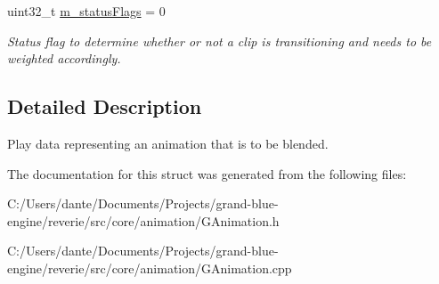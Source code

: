 \begin{DoxyCompactItemize}
\mbox{\label{structrev_1_1_animation_play_data_aab374fcfb8e8071f7c897752ad71163a}} 
uint32\+\_\+t \mbox{\hyperlink{structrev_1_1_animation_play_data_aab374fcfb8e8071f7c897752ad71163a}{m\+\_\+status\+Flags}} = 0
\begin{DoxyCompactList}\small\item\em Status flag to determine whether or not a clip is transitioning and needs to be weighted accordingly. \end{DoxyCompactList}\end{DoxyCompactItemize}


\subsection{Detailed Description}
Play data representing an animation that is to be blended. 

The documentation for this struct was generated from the following files\+:\begin{DoxyCompactItemize}
\item 
C\+:/\+Users/dante/\+Documents/\+Projects/grand-\/blue-\/engine/reverie/src/core/animation/G\+Animation.\+h\item 
C\+:/\+Users/dante/\+Documents/\+Projects/grand-\/blue-\/engine/reverie/src/core/animation/G\+Animation.\+cpp\end{DoxyCompactItemize}
